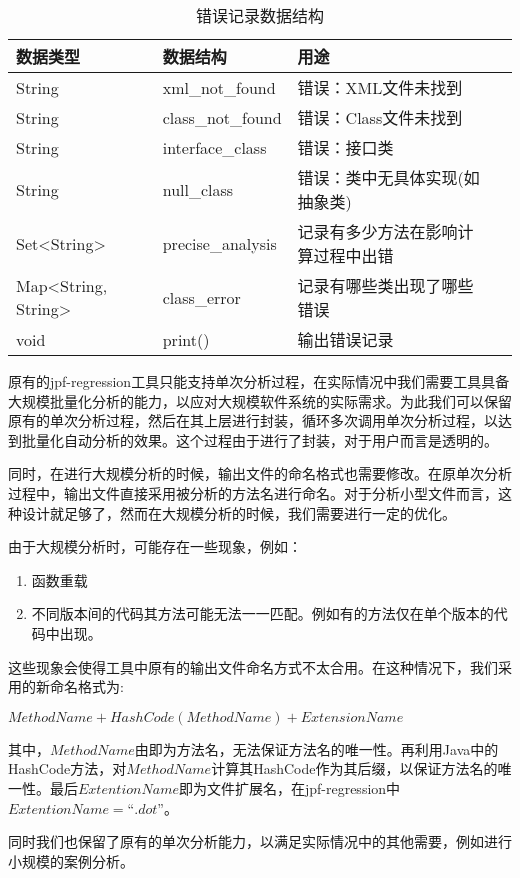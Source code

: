 \begin{table}
	\caption{错误记录数据结构}
	\label{error_data}
	\centering
	\begin{tabular}{lllc}
		\toprule[1.5pt]
		{\heiti 数据类型} &{\heiti 数据结构} & {\heiti 用途} \\\midrule[1pt]
		String & xml\_not\_found & 错误：XML文件未找到 \\
		String & class\_not\_found & 错误：Class文件未找到 \\
		String & interface\_class &  错误：接口类\\
		String & null\_class & 错误：类中无具体实现(如抽象类)\\
		Set<String> & precise\_analysis & 记录有多少方法在影响计算过程中出错\\
		Map<String, String> & class\_error & 记录有哪些类出现了哪些错误\\
		void & print() & 输出错误记录\\
		\bottomrule[1.5pt]
	\end{tabular}
\end{table}


原有的jpf-regression工具只能支持单次分析过程，在实际情况中我们需要工具具备大规模批量化分析的能力，以应对大规模软件系统的实际需求。为此我们可以保留原有的单次分析过程，然后在其上层进行封装，循环多次调用单次分析过程，以达到批量化自动分析的效果。这个过程由于进行了封装，对于用户而言是透明的。

同时，在进行大规模分析的时候，输出文件的命名格式也需要修改。在原单次分析过程中，输出文件直接采用被分析的方法名进行命名。对于分析小型文件而言，这种设计就足够了，然而在大规模分析的时候，我们需要进行一定的优化。

由于大规模分析时，可能存在一些现象，例如：
\begin{enumerate}
	\item 函数重载
	\item 不同版本间的代码其方法可能无法一一匹配。例如有的方法仅在单个版本的代码中出现。
\end{enumerate}

这些现象会使得工具中原有的输出文件命名方式不太合用。在这种情况下，我们采用的新命名格式为:

$MethodName+HashCode(MethodName)+ExtensionName$

其中，$MethodName$由即为方法名，无法保证方法名的唯一性。再利用Java中的HashCode方法，对$MethodName$计算其HashCode作为其后缀，以保证方法名的唯一性。最后$ExtentionName$即为文件扩展名，在jpf-regression中$ExtentionName = “.dot”$。

同时我们也保留了原有的单次分析能力，以满足实际情况中的其他需要，例如进行小规模的案例分析。

